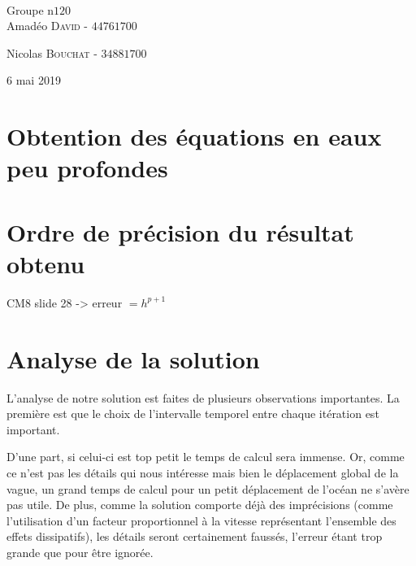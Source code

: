 \documentclass{article}
\begin{document}
\begin{titlepage}
	\HRule\\[1.5cm]
	
	
	Groupe n\degree$120$\\[0.2cm]
	Amadéo \textsc{David}  - $4476 1700$%
	
	Nicolas \textsc{Bouchat} - $3488 1700$%
	
	
	\vfill\vfill\vfill %
	
	{\large 6 mai 2019} %
	
	
	\vfill %
	
\end{titlepage}
\section{Obtention des équations en eaux peu profondes}
\section{Ordre de précision du résultat obtenu}
	CM8 slide 28 -> erreur $ = h^{p+1}$
\section{Analyse de la solution}
	L'analyse de notre solution est faites de plusieurs observations importantes.
	La première est que le choix de l'intervalle temporel entre chaque itération est important.
	
	D'une part, si celui-ci est top petit le temps de calcul sera immense.
	Or, comme ce n'est pas les détails qui nous intéresse mais bien le déplacement global de la vague, un grand temps de calcul pour un petit déplacement de l'océan ne s'avère pas utile.
	De plus, comme la solution comporte déjà des imprécisions (comme l'utilisation d'un facteur proportionnel à la vitesse représentant l'ensemble des effets dissipatifs), les détails seront certainement faussés, l'erreur étant trop grande que pour être ignorée.
	
\end{document}
